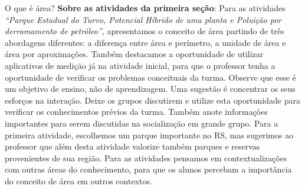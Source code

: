\begin{paginatexto}{O que é área?}
\textbf{Sobre as atividades da primeira seção}: Para as atividades \textit{“Parque Estadual do Turvo, Potencial Híbrido de uma planta e Poluição por derramamento de petróleo”}, apresentamos o conceito de área partindo de três abordagens diferentes: a diferença entre área e perímetro, a unidade de área e área por aproximações. Também destacamos a oportunidade de utilizar aplicativos de medição já na atividade inicial, para que o professor tenha a oportunidade de verificar os problemas conceituais da turma. Observe que esse é um objetivo de ensino, não de aprendizagem. Uma sugestão é concentrar os seus esforços na interação. Deixe os grupos discutirem e utilize esta oportunidade para verificar os conhecimentos prévios da turma. Também anote informações importantes para serem discutidas na socialização em grande grupo. Para a primeira atividade, escolhemos um parque importante no RS, mas sugerimos ao professor que além desta atividade valorize também parques e reservas provenientes de sua região. Para as atividades pensamos em contextualizações com outras áreas do conhecimento, para que os alunos percebam a importância do conceito de área em outros contextos. 
\end{paginatexto}



